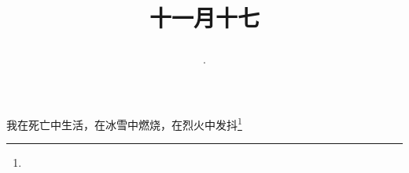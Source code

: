 \title{\date[d=17,m=12,y=2024][year:cn-y,年,month:cn,day:cn,日,·,weekday]·十一月十七 }
我在死亡中生活，在冰雪中燃烧，在烈火中发抖\footnote{ }

